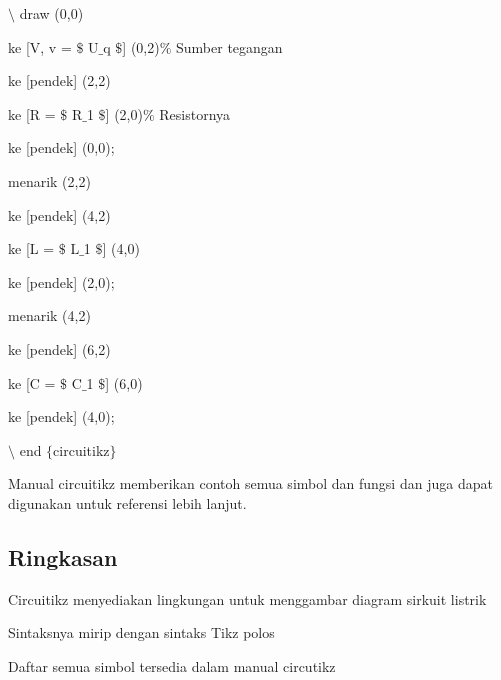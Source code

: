 \noindent 
 $\setminus$ draw (0,0)
\par


\noindent 
 ke [V, v = $\$$ U$ \_ $q $\$$] (0,2)$\%$ Sumber tegangan
\par


\noindent 
 ke [pendek] (2,2)
\par


\noindent 
 ke [R = $\$$ R$ \_ $1 $\$$] (2,0)$\%$ Resistornya
\par


\noindent 
 ke [pendek] (0,0);
\par


\noindent 
 menarik (2,2)
\par


\noindent 
 ke [pendek] (4,2)
\par


\noindent 
 ke [L = $\$$ L$ \_ $1 $\$$] (4,0)
\par


\noindent 
 ke [pendek] (2,0);
\par


\noindent 
 menarik (4,2)
\par


\noindent 
 ke [pendek] (6,2)
\par


\noindent 
 ke [C = $\$$ C$ \_ $1 $\$$] (6,0)
\par


\noindent 
 ke [pendek] (4,0);
\par


\noindent 
 $\setminus$ end $ \{ $circuitikz$ \} $ 
\par


\noindent 
Manual circuitikz memberikan contoh semua simbol dan fungsi dan juga dapat digunakan untuk referensi lebih lanjut.
\par

\subsection{Ringkasan}


\noindent 
Circuitikz menyediakan lingkungan untuk menggambar diagram sirkuit listrik
\par


\noindent 
Sintaksnya mirip dengan sintaks Tikz polos
\par


\noindent 
Daftar semua simbol tersedia dalam manual circutikz
\par



